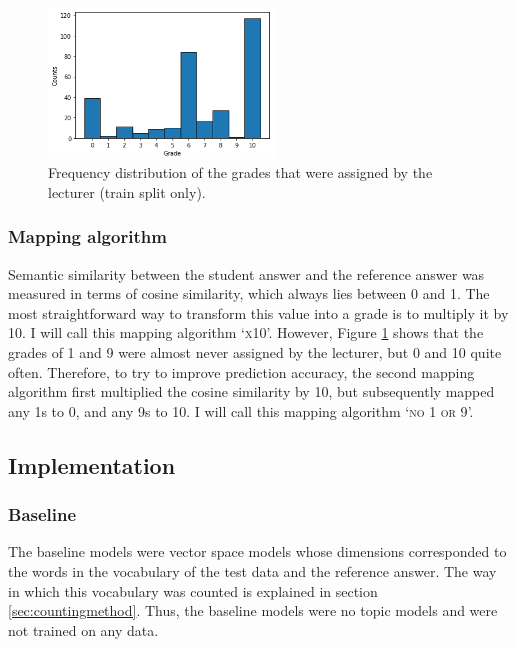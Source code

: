 \documentclass[a4paper,10pt,twoside]{article}
\begin{document}
\begin{figure}
	\vspace{-15pt}
	\includegraphics[width=6cm]{"Histogram of grades"}
	\caption{Frequency distribution of the grades that were assigned by the lecturer (train split only).}
	\label{fig:histogram}
	\vspace{-45pt}
\end{figure} 

\subsubsection{Mapping algorithm}
Semantic similarity between the student answer and the reference answer was measured in terms of cosine similarity, which always lies between 0 and 1. The most straightforward way to transform this value into a grade is to multiply it by 10. I will call this mapping algorithm `\textsc{x10}'. However, Figure \ref{fig:histogram} shows that the grades of 1 and 9 were almost never assigned by the lecturer, but 0 and 10 quite often. Therefore, to try to improve prediction accuracy, the second mapping algorithm first multiplied the cosine similarity by 10, but subsequently mapped any 1s to 0, and any 9s to 10. I will call this mapping algorithm `\textsc{no 1 or 9}'.


\subsection{Implementation}

\subsubsection{Baseline}
The baseline models were vector space models whose dimensions corresponded to the words in the vocabulary of the test data and the reference answer. The way in which this vocabulary was counted is explained in section \ref{sec:countingmethod}. Thus, the baseline models were no topic models and were not trained on any data.
\end{document}
